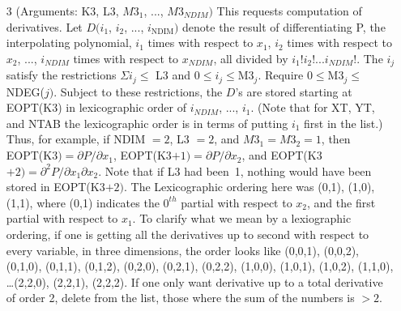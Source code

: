 \documentclass[twoside]{MATH77}
\begin{document}
\begin{description}
\begin{itemize}
\item[3] (Arguments: K3, L3, $M3_1$, ..., $M3_{NDIM})$ This requests
  computation of derivatives. Let $D(i_1$, $i_2$, ...,
  $i_{\text{NDIM}})$ denote the result of differentiating P, the
  interpolating polynomial, $i_1$ times with respect to $x_1$, $i_2$
  times with respect to $x_2$, ..., $i_{NDIM}$ times with respect to
  $x_{NDIM}$, all divided by $i_1!i_2!...i_{NDIM}!$. The $i_j$ satisfy
  the restrictions $\Sigma i_j\leq $ L3 and $0\leq i_j\leq
  \text{M3}_j$. Require $0\leq \text{M3}_j\leq $ NDEG($j)$. Subject to
  these restrictions, the $D$'s are stored starting at EOPT(K3) in
  lexicographic order of $i_{NDIM}$, ..., $i_1$. (Note that for XT,
  YT, and NTAB the lexicographic order is in terms of putting $i_1$
  first in the list.) Thus, for example, if NDIM $=2$, L3 $=2$, and
  $M3_1=M3_2=1$, then EOPT(K3$)=\partial P/\partial x_1$,
  EOPT(K3$+1)=\partial P/\partial x_2$, and EOPT(K3$+2)=\partial
  ^2P/\partial x_1\partial x_2$. Note that if L3 had been~1, nothing
  would have been stored in EOPT(K3$+2).$ The Lexicographic ordering
  here was (0,1), (1,0), (1,1), where (0,1) indicates the $0^{th}$
  partial with respect to $x_2$, and the first partial with respect to
  $x_1$.  To clarify what we mean by a lexiographic ordering, if one
  is getting all the derivatives up to second with respect to every
  variable, in three dimensions, the order looks like (0,0,1),
  (0,0,2), (0,1,0), (0,1,1), (0,1,2), (0,2,0), (0,2,1), (0,2,2),
  (1,0,0), (1,0,1), (1,0,2), (1,1,0), \ldots (2,2,0), (2,2,1),
  (2,2,2).  If one only want derivative up to a total derivative of
  order 2, delete from the list, those where the sum of the numbers is
  $>2$.


\end{itemize}
\end{description}
\end{document}
